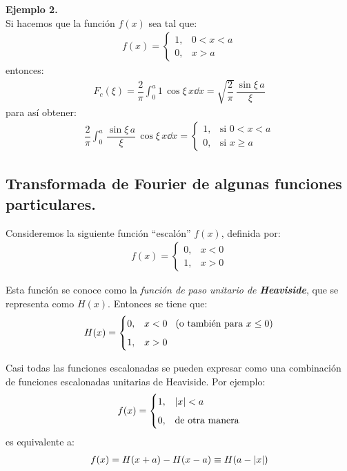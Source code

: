 \noindent
\textbf{Ejemplo 2.}
\\
Si hacemos que la función $f(x)$ sea tal que:
\begin{align*}
f(x) = \begin{cases}
1, & 0 < x < a \\[0.5em]
0, & x > a
\end{cases}
\end{align*}
entonces:
\begin{align*}
F_{c}(\xi) = \dfrac{2}{\pi} \int_{0}^{a} 1 \, \cos \xi \, x \dd{x} = \sqrt{\dfrac{2}{\pi}} \, \dfrac{\sin \xi \, a}{\xi}
\end{align*}
para así obtener:
\begin{align*}
\dfrac{2}{\pi} \int_{0}^{a} \, \dfrac{\sin \xi \, a}{\xi} \, \cos \xi \, x \dd{x} = \begin{cases}
1, & \mbox{si } 0 < x < a \\[0.5em]
0, & \mbox{si } x \geq a
\end{cases}
\end{align*}

\subsection{Transformada de Fourier de algunas funciones particulares.}

Consideremos la siguiente función \enquote{escalón} $f(x)$, definida por:
\begin{align*}
f(x) = \begin{cases}
0, & x < 0 \\[0.5em]
1, & x > 0
\end{cases}
\end{align*}

Esta función se conoce como la \emph{función de paso unitario de \textbf{Heaviside}}, que se representa como $H(x)$. Entonces se tiene que:
\begin{align*}
H(x) = \begin{cases}
0, & x < 0 \hspace{0.3cm} (\mbox{o también para } x \leq 0 ) \\[0.5em]
1, & x > 0
\end{cases}
\end{align*}

Casi todas las funciones escalonadas se pueden expresar como una combinación de funciones escalonadas unitarias de Heaviside. Por ejemplo:
\begin{align*}
f(x) = \begin{cases}
1, & \abs{x} < a \\[0.5em]
0, & \mbox{de otra manera}
\end{cases}
\end{align*}
es equivalente a:
\begin{align*}
f(x) = H(x + a) - H(x- a) \equiv H(a - \abs{x})
\end{align*}

